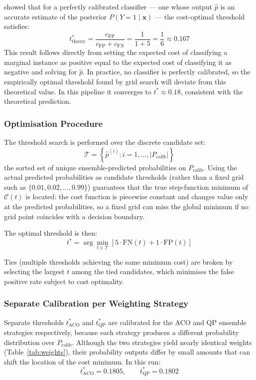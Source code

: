 \documentclass[12pt,a4paper]{article}
\begin{document}
\citet{elkan2001foundations} showed that for a perfectly calibrated classifier — one
whose output $\hat{p}$ is an accurate estimate of the posterior $P(Y=1 \mid
\mathbf{x})$ — the cost-optimal threshold satisfies:
\[
    t^*_\text{theory} = \frac{c_\text{FP}}{c_\text{FP} + c_\text{FN}}
                       = \frac{1}{1 + 5} = \frac{1}{6} \approx 0.167
\]
This result follows directly from setting the expected cost of classifying a marginal
instance as positive equal to the expected cost of classifying it as negative and
solving for $\hat{p}$. In practice, no classifier is perfectly calibrated, so the
empirically optimal threshold found by grid search will deviate from this theoretical
value. In this pipeline it converges to $t^* \approx 0.18$, consistent with the
theoretical prediction.

\subsubsection{Optimisation Procedure}

The threshold search is performed over the discrete candidate set:
\[
    \mathcal{T} = \left\{ \hat{p}^{(i)} : i = 1, \ldots, |P_\text{calib}| \right\}
\]
the sorted set of unique ensemble-predicted probabilities on $P_\text{calib}$. Using
the actual predicted probabilities as candidate thresholds (rather than a fixed grid
such as $\{0.01, 0.02, \ldots, 0.99\}$) guarantees that the true step-function minimum
of $\mathcal{C}(t)$ is located: the cost function is piecewise constant and changes
value only at the predicted probabilities, so a fixed grid can miss the global minimum
if no grid point coincides with a decision boundary.

The optimal threshold is then:
\[
    t^* = \arg\min_{t \in \mathcal{T}}
          \left[ 5 \cdot \text{FN}(t) + 1 \cdot \text{FP}(t) \right]
\]

Ties (multiple thresholds achieving the same minimum cost) are broken by selecting
the largest $t$ among the tied candidates, which minimises the false positive rate
subject to cost optimality.

\subsubsection{Separate Calibration per Weighting Strategy}

Separate thresholds $t^*_\text{ACO}$ and $t^*_\text{QP}$ are calibrated for the ACO
and QP ensemble strategies respectively, because each strategy produces a different
probability distribution over $P_\text{calib}$. Although the two strategies yield
nearly identical weights (Table~\ref{tab:weights}), their probability outputs differ
by small amounts that can shift the location of the cost minimum. In this run:
\[
    t^*_\text{ACO} = 0.1805, \qquad t^*_\text{QP} = 0.1802
\]
\end{document}
